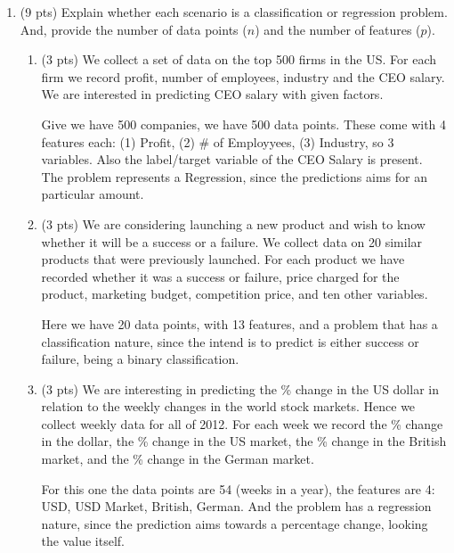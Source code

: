 \documentclass[a4paper]{article}
\theoremstyle{definition}
\newenvironment{soln}{
    \leavevmode\color{blue}\ignorespaces
}{}
\begin{document}
\begin{enumerate}
\item (9 pts) Explain whether each scenario is a classification or regression problem. And, provide the number of data points ($n$) and the number of features ($p$).

\begin{enumerate}
	\item (3 pts) We collect a set of data on the top 500 firms in the US. For each firm we record profit, number of employees, industry and the CEO salary. We are interested in predicting CEO salary with given factors.
	
	\begin{soln}  Give we have 500 companies, we have 500 data points. These come with 4 features each: (1) Profit, (2) # of Employyees, (3) Industry, so 3 variables. Also the label/target variable of the CEO Salary is present. The problem represents a Regression, since the predictions aims for an particular amount. \end{soln}
	
	\item (3 pts) We are considering launching a new product and wish to know whether it will be a success or a failure. We collect data on 20 similar products that were previously launched. For each product we have recorded whether it was a success or failure, price charged for the product, marketing budget, competition price, and ten other variables.
	
	\begin{soln}  Here we have 20 data points, with 13 features, and a problem that has a classification nature, since the intend is to predict is either success or failure, being a binary classification. \end{soln}
	
	\item (3 pts) We are interesting in predicting the \% change in the US dollar in relation to the weekly changes in the world stock markets. Hence we collect weekly data for all of 2012. For each week we record the \% change in the dollar, the \% change in the US market, the \% change in the British market, and the \% change in the German market.
	
	\begin{soln}  For this one the data points are 54 (weeks in a year), the features are 4: USD, USD Market, British, German. And the problem has a regression nature, since the prediction aims towards a percentage change, looking the value itself. \end{soln}
	

\end{enumerate}
\end{enumerate}
\end{document}
